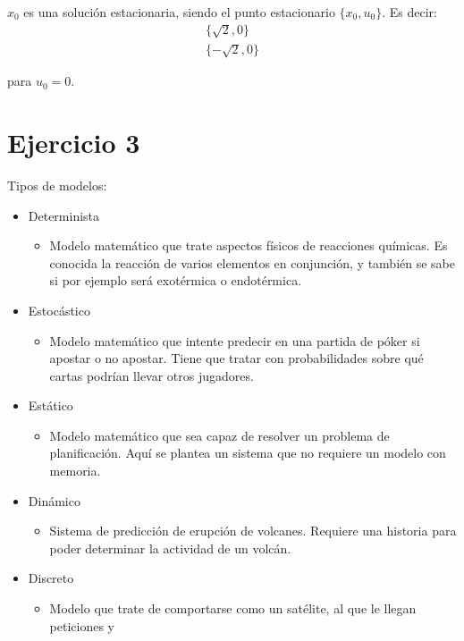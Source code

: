 \documentclass[12pt]{article}
\begin{document}
$x_0$ es una solución estacionaria, siendo el punto estacionario $\{x_0, u_0\}$. Es decir:
\begin{align*}
    \{\sqrt{2}, 0\}\\
    \{-\sqrt{2}, 0\}
\end{align*}

para $u_0 = 0$.
\newpage

\section{Ejercicio 3}
Tipos de modelos:
\begin{itemize}
    \item Determinista
        \begin{itemize}
            \item Modelo matemático que trate aspectos físicos de reacciones químicas. Es conocida la
                  reacción de varios elementos en conjunción, y también se sabe si por ejemplo será
                  exotérmica o endotérmica.
        \end{itemize}
    \item Estocástico
        \begin{itemize}
            \item Modelo matemático que intente predecir en una partida de póker si apostar o no
                  apostar. Tiene que tratar con probabilidades sobre qué cartas podrían llevar otros
                  jugadores.
        \end{itemize}
    \item Estático
        \begin{itemize}
            \item Modelo matemático que sea capaz de resolver un problema de planificación. Aquí
                  se plantea un sistema que no requiere un modelo con memoria.
        \end{itemize}
    \item Dinámico
        \begin{itemize}
            \item Sistema de predicción de erupción de volcanes. Requiere una historia para poder
                  determinar la actividad de un volcán.
        \end{itemize}
    \item Discreto
        \begin{itemize}
            \item Modelo que trate de comportarse como un satélite, al que le llegan peticiones y

\end{itemize}
\end{itemize}
\end{document}
